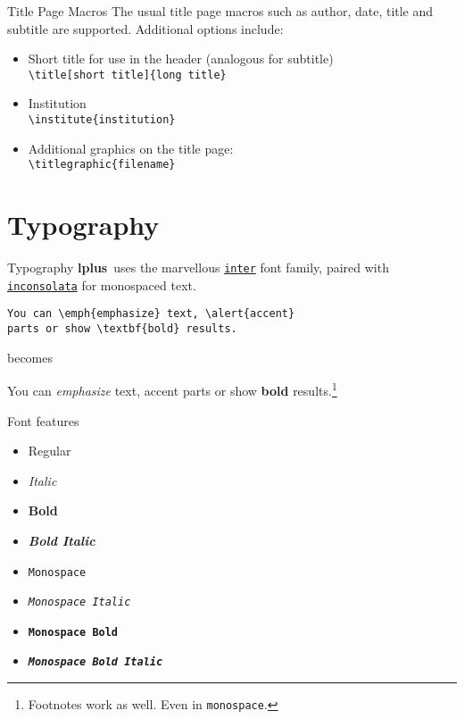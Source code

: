 \documentclass[aspectratio=169]{beamer}
\newcommand{\themename}{\textbf{lplus}~}
\begin{document}
\begin{frame}[fragile]{Title Page Macros}
The usual title page macros such as author, date, title and subtitle are supported.
Additional options include:
\begin{itemize}
\item Short title for use in the header (analogous for subtitle) \\
\verb+\title[short title]{long title}+ 
\item Institution \\ 
\verb+\institute{institution}+
\item Additional graphics on the title page: \\ 
\verb+\titlegraphic{filename}+
\end{itemize}
\end{frame}

\section{Typography}

\begin{frame}[fragile]{Typography}
\themename uses the marvellous \href{https://rsms.me/inter/}{\texttt{inter}} font family, paired with \href{https://levien.com/type/myfonts/inconsolata.html}{\texttt{inconsolata}} for monospaced text.
\begin{verbatim}
You can \emph{emphasize} text, \alert{accent} 
parts or show \textbf{bold} results.
\end{verbatim}
\begin{center}becomes\end{center}
You can \emph{emphasize} text, \alert{accent} parts or show \textbf{bold} results.\footnote{Footnotes work as well. Even in \texttt{monospace}.}
\end{frame}

\begin{frame}{Font features}
  \begin{itemize}
    \item Regular
    \item \textit{Italic}
    \item \textbf{Bold}
    \item \textbf{\textit{Bold Italic}}
    \item \texttt{Monospace}
    \item \texttt{\textit{Monospace Italic}}
    \item \texttt{\textbf{Monospace Bold}}
    \item \texttt{\textbf{\textit{Monospace Bold Italic}}}
  \end{itemize}
\end{frame}
\end{document}
